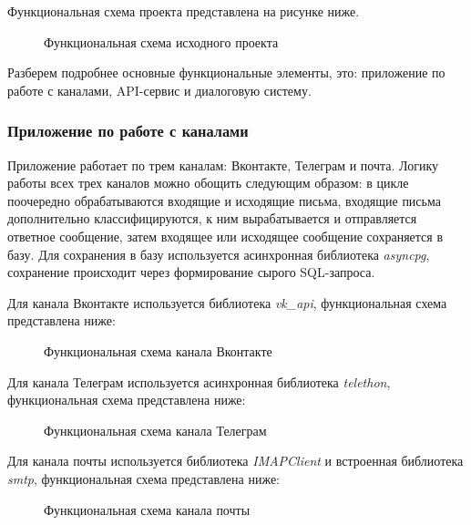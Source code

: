     Функциональная схема проекта представлена на рисунке ниже.
    \begin{figure}[!h]
        \centering
        \caption{Функциональная схема исходного проекта}
        \label{fig:func-schema-before}
    \end{figure}
    
    Разберем подробнее основные функциональные элементы, это: приложение по работе с каналами, API-сервис и диалоговую систему.
    
    \subsubsection*{Приложение по работе с каналами}
    Приложение работает по трем каналам: Вконтакте, Телеграм и почта. Логику работы всех трех каналов можно обощить
    следующим образом: в цикле поочередно обрабатываются входящие  и исходящие письма, входящие письма дополнительно
    классифицируются, к ним вырабатывается и отправляется ответное сообщение, затем входящее или исходящее сообщение
    сохраняется в базу. Для сохранения в базу используется асинхронная библиотека \textit{asyncpg},
    сохранение происходит через формирование сырого SQL-запроса.
    
    Для канала Вконтакте используется библиотека \textit{vk\_api}, функциональная схема представлена ниже:
    \begin{figure}[!h]
        \centering
        \caption{Функциональная схема канала Вконтакте}
        \label{fig:func-schema-vk-before}
    \end{figure}

    Для канала Телеграм используется асинхронная библиотека \textit{telethon}, функциональная схема представлена ниже:
    \begin{figure}[!h]
        \centering
        \caption{Функциональная схема канала Телеграм}
        \label{fig:func-schema-tg-before}
    \end{figure}
    
    Для канала почты используется библиотека \textit{IMAPClient} и встроенная библиотека \textit{smtp},
    функциональная схема представлена ниже:
    \begin{figure}[!h]
        \centering
        \caption{Функциональная схема канала почты}
        \label{fig:func-schema-email-before}
    \end{figure}

